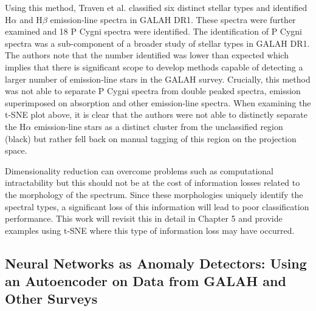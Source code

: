 Using this method, Traven et al. classified six distinct stellar types and identified H$\alpha$ and H$\beta$ emission-line spectra in GALAH DR1. These spectra were further examined and 18 P Cygni spectra were identified. The identification of P Cygni spectra was a sub-component of a broader study of stellar types in GALAH DR1. The authors note that the number identified was lower than expected which implies that there is significant scope to develop methods capable of detecting a larger number of emission-line stars in the GALAH survey. Crucially, this method was not able to separate P Cygni spectra from double peaked spectra, emission superimposed on absorption and other emission-line spectra. When examining the t-SNE plot above, it is clear that the authors were not able to distinctly separate the H$\alpha$ emission-line stars as a distinct cluster from the unclassified region (black) but rather fell back on manual tagging of this region on the projection space. 

Dimensionality reduction can overcome problems such as computational intractability but this should not be at the cost of information losses related to the morphology of the spectrum. Since these morphologies uniquely identify the spectral types, a significant loss of this information will lead to poor classification performance. This work will revisit this in detail in Chapter 5 and provide examples using t-SNE where this type of information loss may have occurred.

\subsection{Neural Networks as Anomaly Detectors: Using an Autoencoder on Data from GALAH and Other Surveys}

